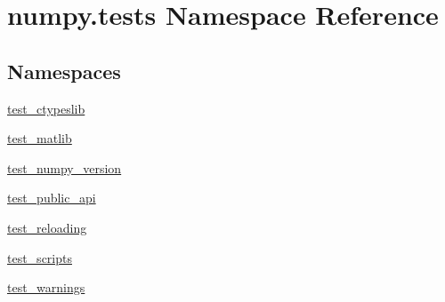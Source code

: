\hypertarget{namespacenumpy_1_1tests}{}\section{numpy.\+tests Namespace Reference}
\label{namespacenumpy_1_1tests}
\subsection*{Namespaces}
\begin{DoxyCompactItemize}
\item 
 \hyperlink{namespacenumpy_1_1tests_1_1test__ctypeslib}{test\+\_\+ctypeslib}
\item 
 \hyperlink{namespacenumpy_1_1tests_1_1test__matlib}{test\+\_\+matlib}
\item 
 \hyperlink{namespacenumpy_1_1tests_1_1test__numpy__version}{test\+\_\+numpy\+\_\+version}
\item 
 \hyperlink{namespacenumpy_1_1tests_1_1test__public__api}{test\+\_\+public\+\_\+api}
\item 
 \hyperlink{namespacenumpy_1_1tests_1_1test__reloading}{test\+\_\+reloading}
\item 
 \hyperlink{namespacenumpy_1_1tests_1_1test__scripts}{test\+\_\+scripts}
\item 
 \hyperlink{namespacenumpy_1_1tests_1_1test__warnings}{test\+\_\+warnings}
\end{DoxyCompactItemize}
